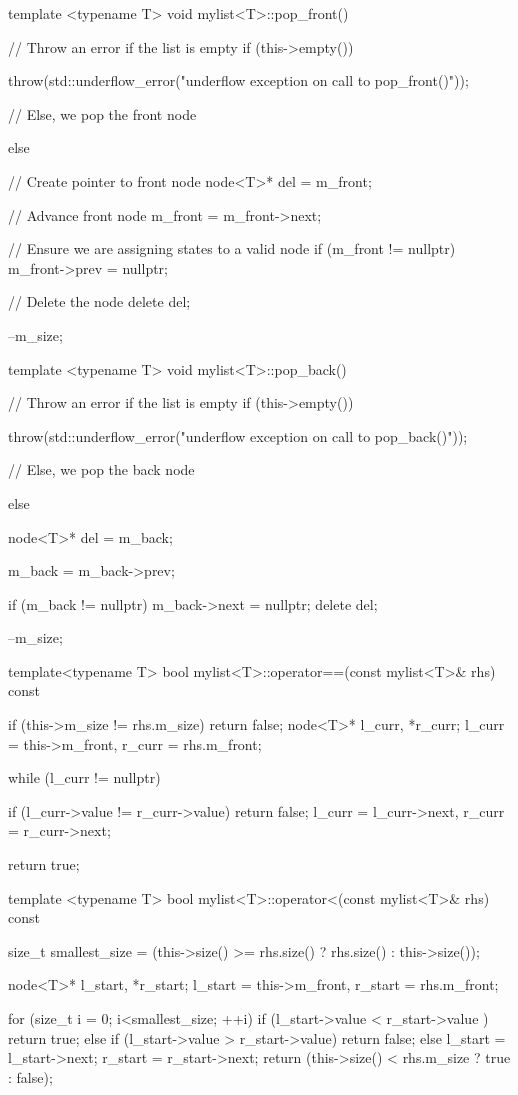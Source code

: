 \documentclass{report}
\begin{document}
    \pagebreak 
    \begin{cppcode}
template <typename T>
void mylist<T>::pop_front() {

    // Throw an error if the list is empty
    if (this->empty()) {
        throw(std::underflow_error("underflow exception on call to pop_front()"));

    // Else, we pop the front node
    } else {

        // Create pointer to front node
        node<T>* del = m_front;
        
        // Advance front node
        m_front = m_front->next;

        // Ensure we are assigning states to a valid node
        if (m_front != nullptr) {
            m_front->prev = nullptr;
        }

        // Delete the node
        delete del;
    }
    --m_size;
}


template <typename T>
void mylist<T>::pop_back() {

    // Throw an error if the list is empty
    if (this->empty()) {
        throw(std::underflow_error("underflow exception on call to pop_back()"));

    // Else, we pop the back node
    } else {
        node<T>* del = m_back;

        m_back = m_back->prev;

        if (m_back != nullptr) {
            m_back->next = nullptr;
        }
        delete del;
    }
    --m_size;
}
    \end{cppcode}

    \pagebreak 
    \begin{cppcode}
template<typename T>
bool mylist<T>::operator==(const mylist<T>& rhs) const {
    if (this->m_size != rhs.m_size) {
        return false;
    } 
    node<T>* l_curr, *r_curr;
    l_curr = this->m_front, 
    r_curr = rhs.m_front;

    while (l_curr != nullptr) {

        if (l_curr->value != r_curr->value) {
            return false;
        } 
        l_curr = l_curr->next,
        r_curr = r_curr->next;
    }
    return true;
}

template <typename T>
bool mylist<T>::operator<(const mylist<T>& rhs) const {
    size_t smallest_size = (this->size() >= rhs.size() ? rhs.size() : this->size());

    node<T>* l_start, *r_start;
    l_start = this->m_front,
    r_start = rhs.m_front;

    for (size_t i = 0; i<smallest_size; ++i) {
        if (l_start->value < r_start->value ) {
            return true;
        } else if (l_start->value > r_start->value) {
            return false;
        } else {
            l_start = l_start->next;
            r_start = r_start->next;
        }
    }
    return (this->size() < rhs.m_size ? true : false);
}
    \end{cppcode}
\end{document}
